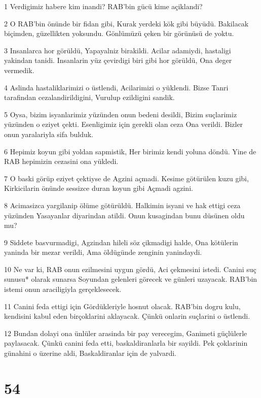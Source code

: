 \par 1 Verdigimiz habere kim inandi? RAB'bin gücü kime açiklandi?
\par 2 O RAB'bin önünde bir fidan gibi, Kurak yerdeki kök gibi büyüdü. Bakilacak biçimden, güzellikten yoksundu. Gönlümüzü çeken bir görünüsü de yoktu.
\par 3 Insanlarca hor görüldü, Yapayalniz birakildi. Acilar adamiydi, hastaligi yakindan tanidi. Insanlarin yüz çevirdigi biri gibi hor görüldü, Ona deger vermedik.
\par 4 Aslinda hastaliklarimizi o üstlendi, Acilarimizi o yüklendi. Bizse Tanri tarafindan cezalandirildigini, Vurulup ezildigini sandik.
\par 5 Oysa, bizim isyanlarimiz yüzünden onun bedeni desildi, Bizim suçlarimiz yüzünden o eziyet çekti. Esenligimiz için gerekli olan ceza Ona verildi. Bizler onun yaralariyla sifa bulduk.
\par 6 Hepimiz koyun gibi yoldan sapmistik, Her birimiz kendi yoluna döndü. Yine de RAB hepimizin cezasini ona yükledi.
\par 7 O baski görüp eziyet çektiyse de Agzini açmadi. Kesime götürülen kuzu gibi, Kirkicilarin önünde sessizce duran koyun gibi Açmadi agzini.
\par 8 Acimasizca yargilanip ölüme götürüldü. Halkimin isyani ve hak ettigi ceza yüzünden Yasayanlar diyarindan atildi. Onun kusagindan bunu düsünen oldu mu?
\par 9 Siddete basvurmadigi, Agzindan hileli söz çikmadigi halde, Ona kötülerin yaninda bir mezar verildi, Ama öldügünde zenginin yanindaydi.
\par 10 Ne var ki, RAB onun ezilmesini uygun gördü, Aci çekmesini istedi. Canini suç sunusu* olarak sunarsa Soyundan gelenleri görecek ve günleri uzayacak. RAB'bin istemi onun araciligiyla gerçeklesecek.
\par 11 Canini feda ettigi için Gördükleriyle hosnut olacak. RAB'bin dogru kulu, kendisini kabul eden birçoklarini aklayacak. Çünkü onlarin suçlarini o üstlendi.
\par 12 Bundan dolayi ona ünlüler arasinda bir pay verecegim, Ganimeti güçlülerle paylasacak. Çünkü canini feda etti, baskaldiranlarla bir sayildi. Pek çoklarinin günahini o üzerine aldi, Baskaldiranlar için de yalvardi.

\chapter{54}

